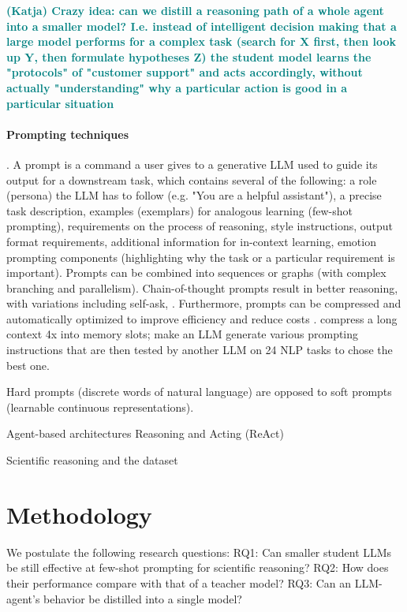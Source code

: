\documentclass{article}
\newcommand{\katja}[1]{\textbf{\textcolor{teal}{(Katja) #1}}}
\begin{document}
\katja{Crazy idea: can we distill a reasoning path of a whole agent into a smaller model? I.e. instead of intelligent decision making that a large model performs for a complex task (search for X first, then look up Y, then formulate hypotheses Z) the student model learns the "protocols" of "customer support" and acts accordingly, without actually "understanding" why a particular action is good in a particular situation}


\paragraph{Prompting techniques}. A prompt is a command a user gives to a generative LLM used to guide its output for a downstream task, which contains several of the following: a role (persona) the LLM has to follow (e.g. "You are a helpful assistant"), a precise task description, examples (exemplars) for analogous learning (few-shot prompting), requirements on the process of reasoning, style instructions, output format requirements, additional information for in-context learning, emotion prompting components (highlighting why the task or a particular requirement is important). Prompts can be combined into sequences or graphs (with complex branching and parallelism). Chain-of-thought prompts result in better reasoning, with variations including self-ask, \cite{schulhoff2024prompt}. Furthermore, prompts can be compressed and automatically optimized to improve efficiency and reduce costs \cite{chang2024efficient}. \cite{ge2023context} compress a long context 4x into memory slots; \cite{zhou2022large} make an LLM generate various prompting instructions that are then tested by another LLM on 24 NLP tasks to chose the best one. 

Hard prompts (discrete words of natural language) are opposed to soft prompts (learnable continuous representations). 

Agent-based architectures \cite{lin2024swiftsage} \cite{ghafarollahi2024sciagents}
Reasoning and Acting (ReAct) 

Scientific reasoning and the dataset \cite{lu2022learn}

\section{Methodology}
We postulate the following research questions: 
RQ1: Can smaller student LLMs be still effective at few-shot prompting for scientific reasoning?
RQ2: How does their performance compare with that of a teacher model?
RQ3: Can an LLM-agent's behavior be distilled into a single model?
\end{document}
